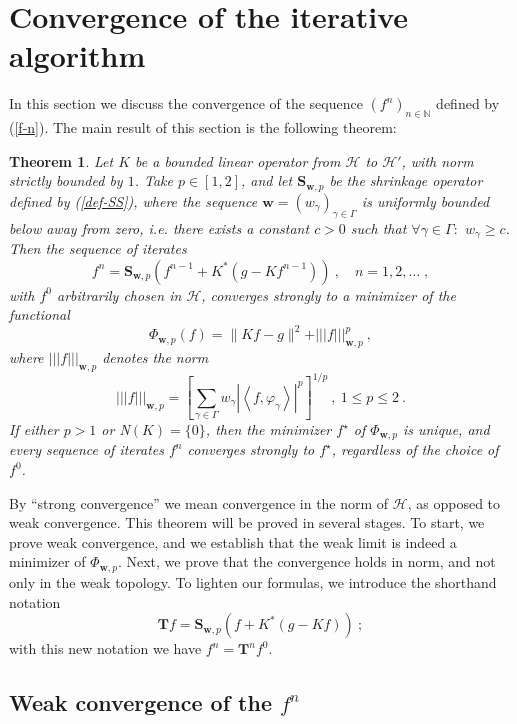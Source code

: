 \documentclass[10pt]{article}
\newtheorem{theorem}{Theorem}[section]
\def\N{\mathbb{N}}
\def\S{\mathbf{S}}
\def\T{\mathbf{T}}
\def\cH{\mathcal{H}}
\def\K{K^*}
\def\ag{w_{\gamma}}
\def\vpg{\varphi_{\gamma}}
\def\g{\gamma}
\newcommand\eref[1]{(\ref{#1})}
\def\Vvert{\vert\!\vert\!\vert}
\begin{document}
\section{Convergence of the iterative algorithm}

In this section we discuss the convergence of the sequence $(f^n)_{n \in \N}$
defined by {\rm \eref{f-n}}. The main result of this section is the
following theorem:
\begin{theorem}
\label{th-3-1}
Let $K$ be a bounded linear operator from
$\cH$ to $\cH'$, with norm strictly bounded by $1$. Take $p \in [1,2]$, and
let $\S_{\mathbf{w},p}$ be the shrinkage operator defined by {\rm
\eref{def-SS}},
where the sequence $\mathbf{w}=(\ag)_{\g \in \Gamma}$ is uniformly
bounded
below away from zero, i.e. there exists a constant $c>0$ such that $\forall \g
\in
\Gamma:$
$\ag \geq c$.
Then the sequence of iterates
\begin{equation*}
f^n=\S_{\mathbf{w},p}\left( f^{n-1} + \K (g- Kf^{n-1})\right)\ ,\quad
n=1,2,\dots\;,
\end{equation*}
with $f^0$ arbitrarily chosen in $\cH$, converges strongly to a minimizer
of the functional
\begin{equation*}
\Phi_{\mathbf{w},p}(f) = \| Kf-g\|^2 +  \Vvert f\Vvert_{\mathbf{w},p}^p\ ,
\end{equation*}
where $\Vvert f\Vvert_{\mathbf{w},p}$ denotes the norm
\begin{equation}
\label{triple-norm}
\Vvert f\Vvert_{\mathbf{w},p} = \left[ \sum_{\g \in \Gamma} \ag
|\left<f,\vpg \right>|^p
\right]^{1/p} ~,~ 1 \leq p \leq 2~.
\end{equation}
If either $p>1$ or {\rm{N}}$(K)=\{0\}$, then the minimizer $f^\star$ of
$\Phi_{\mathbf{w},p}$ is unique, and every sequence of iterates
$f^n$ converges strongly to $f^\star$, regardless of the choice of $f^0$.
\end{theorem}

By ``strong convergence'' we mean convergence in the norm of $\cH$, as
opposed to
weak convergence.
This theorem will be proved in several stages. To start, we prove weak
convergence,
and we establish that the weak limit is indeed a minimizer of
$\Phi_{\mathbf{w},p}$.
Next, we prove that the convergence holds in norm, and not only in the weak
topology.
To lighten our formulas, we introduce the shorthand notation
$$
\T f = \S_{\mathbf{w},p}\left( f + \K (g-Kf)\right)~;
$$
with this new notation we have $f^n= \T^n f^0$.

\subsection{Weak convergence of the $f^n$}
\end{document}
